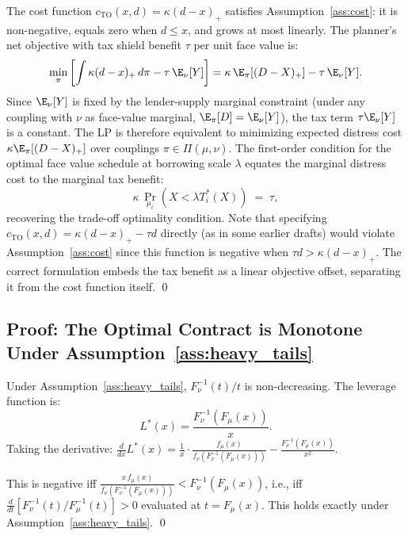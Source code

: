 The cost function $c_{\mathrm{TO}}(x,d) = \kappa(d-x)_+$ satisfies Assumption~\ref{ass:cost}: it is non-negative, equals zero when $d \leq x$, and grows at most linearly. The planner's net objective with tax shield benefit $\tau$ per unit face value is:
\[
  \min_\pi \left[\int \kappa(d-x)_+\,d\pi - \tau\,\E_\nu[Y]\right] = \kappa\,\E_\pi[(D-X)_+] - \tau\,\E_\nu[Y].
\]
Since $\E_\nu[Y]$ is fixed by the lender-supply marginal constraint (under any coupling with $\nu$ as face-value marginal, $\E_\pi[D] = \E_\nu[Y]$), the tax term $\tau\E_\nu[Y]$ is a constant. The LP is therefore equivalent to minimizing expected distress cost $\kappa\E_\pi[(D-X)_+]$ over couplings $\pi \in \Pi(\mu,\nu)$. The first-order condition for the optimal face value schedule at borrowing scale $\lambda$ equates the marginal distress cost to the marginal tax benefit:
\[
  \kappa\,\Pr_{\mu_i}(X < \lambda T_i^*(X)) \;=\; \tau,
\]
recovering the trade-off optimality condition. Note that specifying $c_{\mathrm{TO}}(x,d) = \kappa(d-x)_+ - \tau d$ directly (as in some earlier drafts) would violate Assumption~\ref{ass:cost} since this function is negative when $\tau d > \kappa(d-x)_+$. The correct formulation embeds the tax benefit as a linear objective offset, separating it from the cost function itself. \qed

\subsection*{Proof: The Optimal Contract is Monotone Under Assumption~\ref{ass:heavy_tails}}

Under Assumption~\ref{ass:heavy_tails}, $F_\nu^{-1}(t)/t$ is non-decreasing. The leverage function is:
\[
  L^*(x) = \frac{F_\nu^{-1}(F_\mu(x))}{x}.
\]
Taking the derivative: $\frac{d}{dx}L^*(x) = \frac{1}{x}\cdot\frac{f_\mu(x)}{f_\nu(F_\nu^{-1}(F_\mu(x)))} - \frac{F_\nu^{-1}(F_\mu(x))}{x^2}$.

This is negative iff $\frac{x\,f_\mu(x)}{f_\nu(F_\nu^{-1}(F_\mu(x)))} < F_\nu^{-1}(F_\mu(x))$, i.e., iff $\frac{d}{dt}[F_\nu^{-1}(t)/F_\mu^{-1}(t)] > 0$ evaluated at $t = F_\mu(x)$. This holds exactly under Assumption~\ref{ass:heavy_tails}. \qed
